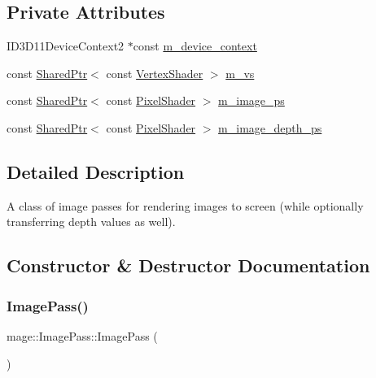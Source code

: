 \subsection*{Private Attributes}
\begin{DoxyCompactItemize}
\item 
I\+D3\+D11\+Device\+Context2 $\ast$const \hyperlink{classmage_1_1_image_pass_ac4eef3a91fd1751073f02f0e1b6efcc3}{m\+\_\+device\+\_\+context}
\item 
const \hyperlink{namespacemage_a1e01ae66713838a7a67d30e44c67703e}{Shared\+Ptr}$<$ const \hyperlink{classmage_1_1_vertex_shader}{Vertex\+Shader} $>$ \hyperlink{classmage_1_1_image_pass_a2539697e993d9855fba607e783e13edf}{m\+\_\+vs}
\item 
const \hyperlink{namespacemage_a1e01ae66713838a7a67d30e44c67703e}{Shared\+Ptr}$<$ const \hyperlink{namespacemage_a27ecaf266420ee7a494d64edc0757129}{Pixel\+Shader} $>$ \hyperlink{classmage_1_1_image_pass_a03c8e8ae45da02959d35b8842175e466}{m\+\_\+image\+\_\+ps}
\item 
const \hyperlink{namespacemage_a1e01ae66713838a7a67d30e44c67703e}{Shared\+Ptr}$<$ const \hyperlink{namespacemage_a27ecaf266420ee7a494d64edc0757129}{Pixel\+Shader} $>$ \hyperlink{classmage_1_1_image_pass_a1437d3e0816374dc9b79118b2bc649b3}{m\+\_\+image\+\_\+depth\+\_\+ps}
\end{DoxyCompactItemize}


\subsection{Detailed Description}
A class of image passes for rendering images to screen (while optionally transferring depth values as well). 

\subsection{Constructor \& Destructor Documentation}
\hypertarget{classmage_1_1_image_pass_af0254b5af3af9fba2f8969a29bf44f9c}{}\label{classmage_1_1_image_pass_af0254b5af3af9fba2f8969a29bf44f9c} 
\subsubsection{\texorpdfstring{Image\+Pass()}{ImagePass()}\hspace{0.1cm}{\footnotesize\ttfamily [1/3]}}
{\footnotesize\ttfamily mage\+::\+Image\+Pass\+::\+Image\+Pass (\begin{DoxyParamCaption}{ }\end{DoxyParamCaption})}

